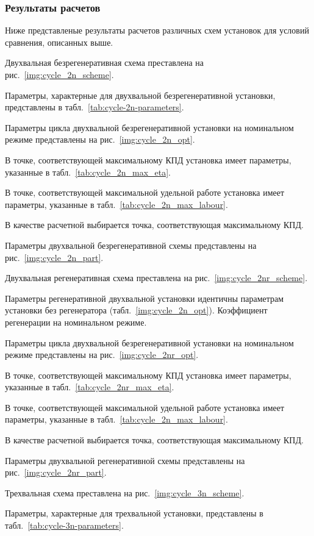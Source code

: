 \subsubsection{Результаты расчетов}
Ниже представленые результаты расчетов различных схем установок для условий сравнения, описанных выше.

Двухвальная безрегенеративная схема преставлена на рис.~\ref{img:cycle_2n_scheme}.

Параметры, характерные для двухвальной безрегенеративной установки, представлены в табл.~\ref{tab:cycle-2n-parameters}.

Параметры цикла двухвальной безрегенеративной установки на номинальном режиме представлены на рис.~\ref{img:cycle_2n_opt}.

В точке, соответствующей максимальному КПД установка имеет параметры, указанные в табл.~\ref{tab:cycle_2n_max_eta}.

В точке, соответствующей максимальной удельной работе установка имеет параметры, указанные в табл.~\ref{tab:cycle_2n_max_labour}.

В качестве расчетной выбирается точка, соответствующая максимальному КПД.

Параметры двухвальной безрегенеративной схемы представлены на рис.~\ref{img:cycle_2n_part}.

Двухвальная регенеративная схема преставлена на рис.~\ref{img:cycle_2nr_scheme}.

Параметры регенеративной двухвальной установки идентичны параметрам установки без регенератора (табл.~\ref{img:cycle_2n_opt}). Коэффициент регенерации на номинальном режиме.

Параметры цикла двухвальной безрегенеративной установки на номинальном режиме представлены на рис.~\ref{img:cycle_2nr_opt}.

В точке, соответствующей максимальному КПД установка имеет параметры, указанные в табл.~\ref{tab:cycle_2nr_max_eta}.

В точке, соответствующей максимальной удельной работе установка имеет параметры, указанные в табл.~\ref{tab:cycle_2n_max_labour}.

В качестве расчетной выбирается точка, соответствующая максимальному КПД.

Параметры двухвальной регенеративной схемы представлены на рис.~\ref{img:cycle_2nr_part}.

Трехвальная схема преставлена на рис.~\ref{img:cycle_3n_scheme}.

Параметры, характерные для трехвальной установки, представлены в табл.~\ref{tab:cycle-3n-parameters}.

